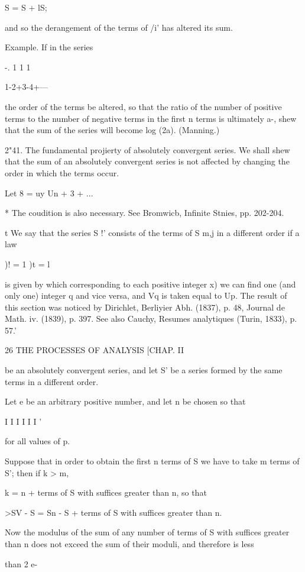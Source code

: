 S = S + lS;

and so the derangement of the terms of /i' has altered its sum.

Example. If in the series

-. 1 1 1

1-2+3-4+---

the order of the terms be altered, so that the ratio of the number of
positive terms to the number of negative terms in the first n terms is
ultimately a-, shew that the sum of the series will become log (2a).
(Manning.)

2"41. The fundamental projierty of absolutely convergent series. We
shall shew that the sum of an absolutely convergent series is not
affected by changing the order in which the terms occur.

Let 8 = uy Un + 3 + ...

* The coudition is also necessary. See Bromwicb, Infinite Stnies, pp.
202-204.

t We say that the series S !' consists of the terms of S m,j in a
different order if a law

)! = 1 )t = l

is given by which corresponding to each positive integer x) we can
find one (and only one) integer q and vice versa, and Vq is taken
equal to Up. The result of this section was noticed by Dirichlet,
Berliyier Abh. (1837), p. 48, Journal de Math. iv. (1839), p. 397. See
also Cauchy, Resumes analytiques (Turin, 1833), p. 57.'



26 THE PROCESSES OF ANALYSIS [CHAP. II

be an absolutely convergent series, and let S' be a series formed by
the same terms in a different order.

Let e be an arbitrary positive number, and let n be chosen so that

I I I I I I '

for all values of p.

Suppose that in order to obtain the first n terms of S we have to take
m terms of S'; then if k > m,

 k = n + terms of S with suffices greater than n, so that

>SV - S = Sn - S + terms of S with suffices greater than n.

Now the modulus of the sum of any number of terms of S with suffices
greater than n does not exceed the sum of their moduli, and therefore
is less

than 2 e-


